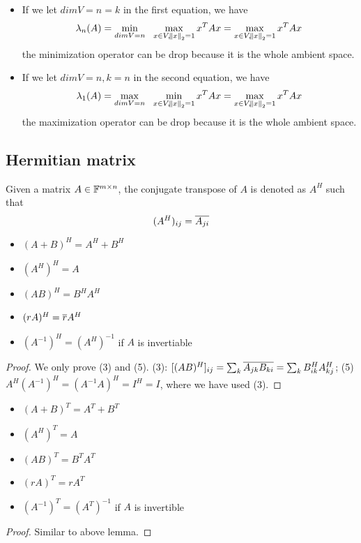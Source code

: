 \begin{refsection}
\begin{remark}\hfill
	\begin{itemize}
		\item If we let $dim V = n = k$ in the first equation, we have
		$$\lambda_n(A) = \min_{dim V = n} ~~ \max_{x\in V,\norm{x}_2 = 1} x^TAx = \max_{x\in V,\norm{x}_2 = 1} x^TAx $$
		the minimization operator can be drop because it is the whole ambient space.
		\item If we let $dim V = n, k = n$ in the second equation, we have
		$$\lambda_1(A) = \max_{dim V = n} ~~ \min_{x\in V,\norm{x}_2 = 1} x^TAx = \max_{x\in V,\norm{x}_2 = 1} x^TAx $$
		the maximization operator can be drop because it is the whole ambient space.
	\end{itemize}
\end{remark}


\subsection{Hermitian matrix}
\begin{definition}
Given a matrix $A\in \mathbb{F}^{m\times n}$, the conjugate transpose of $A$ is denoted as $A^H$ such that
$$(A^H)_{ij} = \overline{A_{ji}}$$
\end{definition}


\begin{lemma}\hfill
\begin{itemize}
    \item $(A+B)^H = A^H + B^H$
    \item $(A^H)^H = A$
    \item $(AB)^H=B^HA^H$
    \item $(rA)^H = \overline{r}A^H$
    \item $(A^{-1})^H = (A^H)^{-1}$ if $A$ is invertiable
\end{itemize}
\end{lemma}
\begin{proof}
We only prove (3) and (5). (3): $[(AB)^H]_{ij} = \sum_k \overline{A_{jk}B_{ki}} = \sum_{k} B^H_{ik}A^H_{kj}$; (5) $A^H (A^{-1})^H = (A^{-1}A)^H = I^H = I$, where we have used (3).
\end{proof}


\begin{lemma}\hfill
\begin{itemize}
    \item $(A+B)^T = A^T + B^T$
    \item $(A^H)^T = A$
    \item $(AB)^T=B^TA^T$
    \item $(rA)^T = rA^T$
    \item $(A^{-1})^T = (A^T)^{-1}$ if $A$ is invertible
\end{itemize}
\end{lemma}
\begin{proof}
Similar to above lemma.
\end{proof}


\end{refsection}

